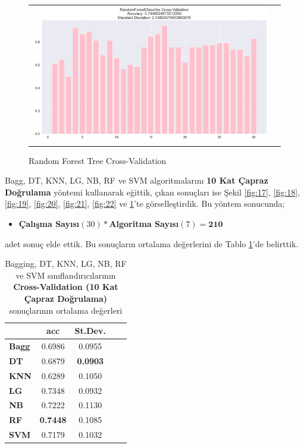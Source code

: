 \documentclass[conference]{IEEEtran}
\begin{document}
\begin{figure}[!h]
	\centering
	\begin{center}
		\begin{tabular}{cc}
			\includegraphics[scale=0.18]{pictures/pic_23.png}&
		\end{tabular}
	\end{center}
	\caption{Random Forest Tree Cross-Validation}
	\label{fig:23}
\end{figure}
\pagebreak

\quad  Bagg, DT, KNN, LG, NB, RF ve SVM algoritmalarını \textbf{10 Kat Çapraz Doğrulama} yöntemi kullanarak eğittik, çıkan sonuçları ise Şekil \ref{fig:17}, \ref{fig:18}, \ref{fig:19}, \ref{fig:20}, \ref{fig:21}, \ref{fig:22} ve \ref{fig:23}'te görselleştirdik. Bu yöntem sonucunda;
\begin{itemize}
\item \textbf{Çalışma Sayısı}$(30) * $\textbf{Algoritma Sayısı}$(7) = \textbf{210}$
\end{itemize}
adet sonuç elde ettik. Bu sonuçların ortalama değerlerini de Tablo \ref{tbl:02}'de belirttik.

\begin{table}[h]
	\centering
	\normalsize
	\begin{tabular}{|l|c|c|c|c|}
		\hline
					& \textbf{acc}	& \textbf{St.Dev.}		\\ \hline
		\textbf{Bagg}	& 0.6986		& 0.0955			\\ \hline
		\textbf{DT}		& 0.6879		& \textbf{0.0903}		\\ \hline
		\textbf{KNN}	& 0.6289		& 0.1050 			\\ \hline
		\textbf{LG}		& 0.7348		& 0.0932			\\ \hline
		\textbf{NB}		& 0.7222		& 0.1130			\\ \hline
		\textbf{RF}		& \textbf{0.7448}	& 0.1085			\\ \hline
		\textbf{SVM}	& 0.7179		& 0.1032			\\ \hline
	\end{tabular}
	\caption{Bagging, DT, KNN, LG, NB, RF ve SVM sınıflandırıcılarının \textbf{Cross-Validation (10 Kat Çapraz Doğrulama)} sonuçlarının ortalama değerleri}
	\label{tbl:02}
\end{table}
\end{document}
